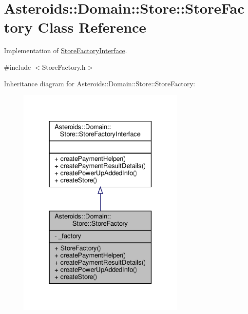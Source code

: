 \hypertarget{classAsteroids_1_1Domain_1_1Store_1_1StoreFactory}{}\section{Asteroids\+:\+:Domain\+:\+:Store\+:\+:Store\+Factory Class Reference}
\label{classAsteroids_1_1Domain_1_1Store_1_1StoreFactory}


Implementation of \hyperlink{classAsteroids_1_1Domain_1_1Store_1_1StoreFactoryInterface}{Store\+Factory\+Interface}.  




{\ttfamily \#include $<$Store\+Factory.\+h$>$}



Inheritance diagram for Asteroids\+:\+:Domain\+:\+:Store\+:\+:Store\+Factory\+:\nopagebreak
\begin{figure}[H]
\begin{center}
\leavevmode
\includegraphics[width=237pt]{classAsteroids_1_1Domain_1_1Store_1_1StoreFactory__inherit__graph}
\end{center}
\end{figure}


